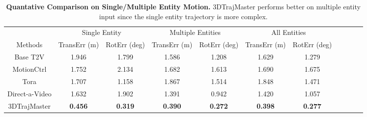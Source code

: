 \begin{table}[!ht]

\vspace{-2em}
\caption{\textbf{Quantative Comparison on Single/Multiple Entity Motion.} 3DTrajMaster performs better on multiple entity input since the single entity trajectory is more complex.}
\label{tab:main_comparison}

\centering
\begin{threeparttable}
\resizebox{.99\textwidth}{!} 
{
\begin{tabular}{ccccccccccc}
\toprule
& \multicolumn{2}{c}{ Single Entity } & \multicolumn{2}{c}{Multiple Entities} & \multicolumn{2}{c}{All Entities}\\
\cmidrule(lr){2-3} 
\cmidrule(lr){4-5} 
\cmidrule(lr){6-7} 
Methods &  TransErr (m)  & RotErr (deg)   & TransErr (m)  & RotErr (deg)   & TransErr (m)  & RotErr (deg)  \\

\midrule

Base T2V & 1.946 & 1.799 &  1.586 & 1.208 & 1.629 & 1.279 \\
MotionCtrl & 1.752 & 2.134 & 1.682 & 1.613 & 1.690 & 1.675 \\
Tora & 1.707 & 1.158 & 1.867 & 1.514 & 1.848 & 1.471 \\
Direct-a-Video & 1.632 & 1.902 & 1.391 & 0.942 & 1.420 & 1.057 \\
\midrule
3DTrajMaster & \textbf{0.456} & \textbf{0.319} & \textbf{0.390} & \textbf{0.272} & \textbf{0.398} & \textbf{0.277} \\


\bottomrule

\end{tabular}
}

\end{threeparttable}
\end{table}


